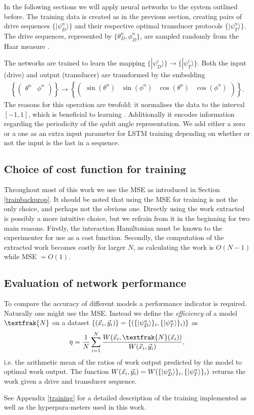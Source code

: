 In the following sections we will apply neural networks to the system outlined before.
The training data is created as in the previous section, creating pairs of drive sequences $\{|\psi_D^n \rangle\}$ and their respective optimal transducer protocols $\{|\psi_T^n \rangle\}$.
The drive sequences, represented by $\{\theta_D^n, \phi_D^n\}$, are sampled randomly from the Haar measure \cite{Mezzadri}.

The networks are trained to learn the mapping $\{|\psi_D^i \rangle\} \to \{|\psi_T^i \rangle\}$.
Both the input (drive) and output (transducer) are transformed by the embedding
\begin{align} \label{embedding}
	\left\{
	\begin{pmatrix}
	\theta^n & \phi^n \\
	\end{pmatrix}
	\right\}
	\to
	\left\{
	\begin{pmatrix}
	\sin(\theta^n) & \sin(\phi^n) & \cos(\theta^n)  & \cos(\phi^n) \\
	\end{pmatrix}
	\right\}.
\end{align}
The reasons for this operation are twofold: it normalises the data to the interval $[-1, 1]$, which is beneficial to learning \cite{LeCun2012}. Additionally it encodes information regarding the periodicity of the qubit angle representation.
We add either a zero or a one as an extra input parameter for LSTM training depending on whether or not the input is the last in a sequence.

\subsection{Choice of cost function for training}
Throughout most of this work we use the MSE as introduced in Section \ref{trainbackprop}.
It should be noted that using the MSE for training is not the only choice, and perhaps not the obvious one.
Directly using the work extracted is possibly a more intuitive choice, but we refrain from it in the beginning for two main reasons.
Firstly, the interaction Hamiltonian must be known to the experimenter for use as a cost function.
Secondly, the computation of the extracted work becomes costly for larger $N$, as calculating the work is $O(N-1)$ while MSE $= O(1)$.

\subsection{Evaluation of network performance}
To compare the accuracy of different models a performance indicator is required. 
Naturally one might use the MSE.
Instead we define the \textit{efficiency} of a model $\textfrak{N}$ on a dataset $\{(\vec{x}_i, \vec{y}_i)\} = \{(\{\ket{\psi_D^n}\}_i, \{\ket{\psi_T^n}\}_i) \}$ as
\begin{align}
	\eta = \frac{1}{N} \sum_{i=1}^N \frac{W(\vec{x}_i,\textfrak{N}(\vec{x}_i))}{W(\vec{x}_i,\vec{y}_i)},
\end{align}
i.e. the arithmetic mean of the ratios of work output predicted by the model to optimal work output.
The function $W(\vec{x}_i, \vec{y}_i) = W(\{\ket{\psi_D^n}\}_i, \{\ket{\psi_T^n}\}_i)$ returns the work given a drive and transducer sequence.

See Appendix \ref{training} for a detailed description of the training implemented as well as the hyperpara-meters used in this work.